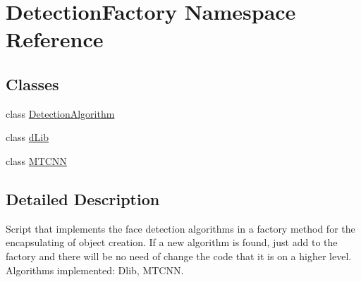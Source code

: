\hypertarget{namespaceDetectionFactory}{}\section{Detection\+Factory Namespace Reference}
\label{namespaceDetectionFactory}
\subsection*{Classes}
\begin{DoxyCompactItemize}
\item 
class \hyperlink{classDetectionFactory_1_1DetectionAlgorithm}{Detection\+Algorithm}
\item 
class \hyperlink{classDetectionFactory_1_1dLib}{d\+Lib}
\item 
class \hyperlink{classDetectionFactory_1_1MTCNN}{M\+T\+C\+NN}
\end{DoxyCompactItemize}


\subsection{Detailed Description}
\begin{DoxyVerb}Script that implements the face detection algorithms in a factory method for the encapsulating of object creation.
If a new algorithm is found, just add to the factory and there will be no need of change the code that it is on a higher level.
Algorithms implemented: Dlib, MTCNN.
\end{DoxyVerb}
 